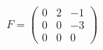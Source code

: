 \documentclass[preview]{standalone}
\begin{document}
\begin{align*}
F = \begin{pmatrix} 0 & 2 & -1 \\ 0 & 0 & -3 \\ 0 & 0 & 0 \end{pmatrix}
\end{align*}
\end{document}
